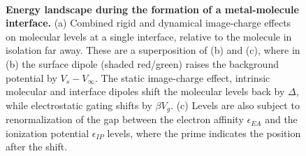 \documentclass[aip,jcp,a4paper,reprint,floatfix,superscriptaddress]{revtex4-1}
\begin{document}
\begin{figure}
\\
\caption{\textbf{Energy landscape during the formation of a metal-molecule interface.} 
(a) Combined rigid and dynamical image-charge effects on molecular levels at a single interface, relative to the molecule in isolation far away. These are a superposition of (b) and (c), where in (b) the surface dipole (shaded red/green) raises the background potential by $V_s-V_\infty$. The static image-charge effect, intrinsic molecular and interface dipoles shift the molecular levels back by $\Delta$, while electrostatic gating shifts by $\beta V_g$. (c) Levels are also subject to renormalization of the gap between the electron affinity $\epsilon_{EA}$ and the ionization potential $\epsilon_{IP}$ levels, where the prime indicates the position after the shift. 
}\label{fg:landscape}
\end{figure}
\end{document}
